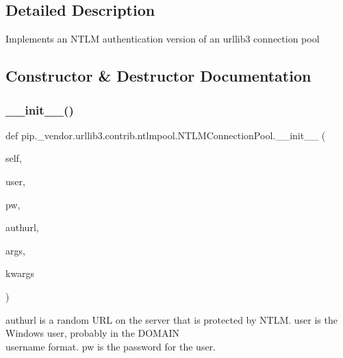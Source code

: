 \subsection{Detailed Description}
\begin{DoxyVerb}Implements an NTLM authentication version of an urllib3 connection pool
\end{DoxyVerb}
 

\subsection{Constructor \& Destructor Documentation}
\mbox{\label{classpip_1_1__vendor_1_1urllib3_1_1contrib_1_1ntlmpool_1_1NTLMConnectionPool_a0febfa0b4affbf6ce568fc420c705a49}} 
\subsubsection{\texorpdfstring{\+\_\+\+\_\+init\+\_\+\+\_\+()}{\_\_init\_\_()}}
{\footnotesize\ttfamily def pip.\+\_\+vendor.\+urllib3.\+contrib.\+ntlmpool.\+N\+T\+L\+M\+Connection\+Pool.\+\_\+\+\_\+init\+\_\+\+\_\+ (\begin{DoxyParamCaption}\item[{}]{self,  }\item[{}]{user,  }\item[{}]{pw,  }\item[{}]{authurl,  }\item[{}]{args,  }\item[{}]{kwargs }\end{DoxyParamCaption})}

\begin{DoxyVerb}authurl is a random URL on the server that is protected by NTLM.
user is the Windows user, probably in the DOMAIN\\username format.
pw is the password for the user.
\end{DoxyVerb}
 

